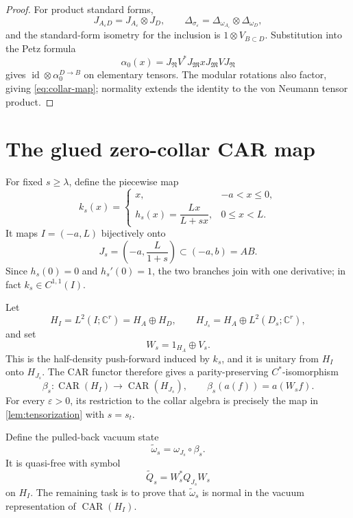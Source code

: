 \documentclass[11pt]{article}
\theoremstyle{accent}
\theoremstyle{definition}
\newcommand{\cM}{\mathfrak{M}}
\newcommand{\cN}{\mathfrak{N}}
\newcommand{\CAR}{\operatorname{CAR}}
\newcommand{\id}{\operatorname{id}}
\newcommand{\eps}{\varepsilon}
\begin{document}
\begin{proof}
For product standard forms,
\[
 J_{A_\eps D}=J_{A_\eps}\otimes J_D,
 \qquad
 \Delta_{\sigma_\eps}=\Delta_{\omega_{A_\eps}}\otimes\Delta_{\omega_D},
\]
and the standard-form isometry for the inclusion is \(1\otimes V_{B\subset D}\).  Substitution into the Petz formula
\[
 \alpha_0(x)=J_{\cN}V^*J_{\cM}xJ_{\cM}VJ_{\cN}
\]
gives \(\id\otimes\alpha_0^{D\to B}\) on elementary tensors.  The modular rotations also factor, giving \eqref{eq:collar-map}; normality extends the identity to the von Neumann tensor product.
\end{proof}

\section{The glued zero-collar CAR map}

For fixed \(s\ge\lambda\), define the piecewise map
\begin{equation}\label{eq:k-s}
 k_s(x)=
 \begin{cases}
 x,&-a<x\le0,\\[1mm]
 h_s(x)=\dfrac{Lx}{L+sx},&0\le x<L.
 \end{cases}
\end{equation}
It maps \(I=(-a,L)\) bijectively onto
\begin{equation}\label{eq:J-s}
 J_s=\left(-a,\frac{L}{1+s}\right)\subset(-a,b)=AB.
\end{equation}
Since \(h_s(0)=0\) and \(h_s'(0)=1\), the two branches join with one derivative; in fact \(k_s\in C^{1,1}(I)\).

Let
\[
 H_I=L^2(I;\mathbb C^r)=H_A\oplus H_D,
 \qquad
 H_{J_s}=H_A\oplus L^2(D_s;\mathbb C^r),
\]
and set
\begin{equation}\label{eq:W-s}
 W_s=1_{H_A}\oplus V_s.
\end{equation}
This is the half-density push-forward induced by \(k_s\), and it is unitary from \(H_I\) onto \(H_{J_s}\).  The CAR functor therefore gives a parity-preserving \(C^*\)-isomorphism
\begin{equation}\label{eq:beta-Cstar}
 \boxed{
 \beta_s:\CAR(H_I)\longrightarrow\CAR(H_{J_s}),
 \qquad
 \beta_s(a(f))=a(W_sf).
 }
\end{equation}
For every \(\eps>0\), its restriction to the collar algebra is precisely the map in \cref{lem:tensorization} with \(s=s_t\).

Define the pulled-back vacuum state
\begin{equation}\label{eq:omega-tilde}
 \widetilde\omega_s=\omega_{J_s}\circ\beta_s.
\end{equation}
It is quasi-free with symbol
\begin{equation}\label{eq:Q-tilde}
 \widetilde Q_s=W_s^*Q_{J_s}W_s
\end{equation}
on \(H_I\).  The remaining task is to prove that \(\widetilde\omega_s\) is normal in the vacuum representation of \(\CAR(H_I)\).
\end{document}
